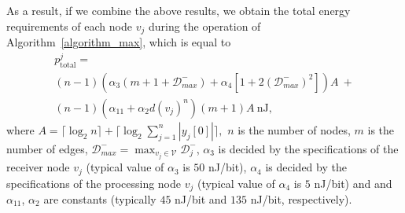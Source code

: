 \documentclass[twocolumn]{autart}    %
\begin{document}
As a result, if we combine the above results, we obtain the total energy requirements of each node $v_j$ during the operation of Algorithm~\ref{algorithm_max}, which is equal to
\begin{align}
& p^j_{\text{total}} = & \nonumber \\ 
& (n-1) (\alpha_3 (m + 1 + \mathcal{D}_{max}^-) + \alpha_4 [1 + 2(\mathcal{D}_{max}^-)^2]) A \ + & \nonumber \\
& (n-1)(\alpha_{11} + \alpha_{2} d(v_j)^n) (m + 1) A \ \text{nJ}, & \label{energy_energy_result}
\end{align}
where  
$
A = \lceil \log_{2} n \rceil + \lceil \log_{2} \sum_{j=1}^n | y_j[0] | \rceil , 
$ 
$n$ is the number of nodes, $m$ is the number of edges, $\mathcal{D}_{max}^- = \max_{v_j \in \mathcal{V}} \mathcal{D}_j^-$, $\alpha_3$ is decided by the specifications of the receiver node $v_j$ (typical value of $\alpha_3$ is $50$ nJ/bit), $\alpha_4$ is decided by the specifications of the processing node $v_j$ (typical value of $\alpha_4$ is $5$ nJ/bit) and and $\alpha_{11}$, $\alpha_{2}$ are constants (typically $45$ nJ/bit and $135$ nJ/bit, respectively). 


\end{document}
